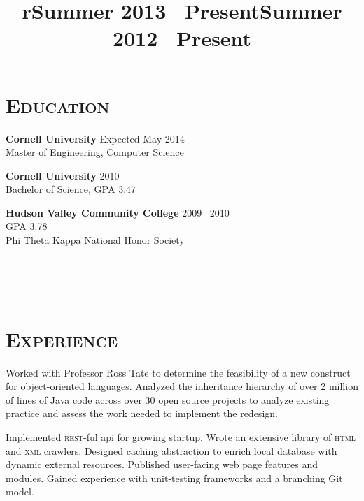 \begin{resume}


\section{\textsc{Education}}

\textbf{Cornell University} \hfill Expected May 2014 \\
Master of Engineering, Computer Science

\textbf{Cornell University} \hfill 2010 \\
Bachelor of Science, GPA 3.47

\textbf{Hudson Valley Community College} \hfill 2009 \textendash\ 2010 \\ 
GPA 3.78\\
Phi Theta Kappa National Honor Society


\begin{formatb}
  \title{r}\\
  \\
  \body\\
\end{formatb}

\vfill

\section{\textsc{Experience}}

\title{Summer 2013 \textendash \ Present}
\location{}
\begin{position}
Worked with Professor Ross Tate to determine the feasibility of a new construct for object-oriented languages.
Analyzed the inheritance hierarchy of over 2 million of lines of Java code across over 30 open source projects to analyze existing practice and assess the work needed to implement the redesign.
\end{position}

\title{Summer 2012 \textendash\ Present}
\location{}
\begin{position}
Implemented \textsc{rest-}ful api for growing startup.
Wrote an extensive library of \textsc{html} and \textsc{xml} crawlers.
Designed caching abstraction to enrich local database with dynamic external resources.
Published user-facing web page features and modules.
Gained experience with unit-testing frameworks and a branching Git model.
\end{position}


\end{resume}
